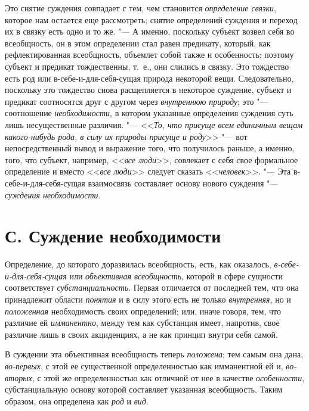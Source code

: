 Это снятие суждения совпадает с тем, чем становится
{\em определение связки},
которое нам остается еще рассмотреть; снятие определений
суждения и переход их в связку есть одно и то же. "--- А
именно, поскольку субъект возвел себя во всеобщность, он в этом определении
стал равен предикату, который, как рефлектированная всеобщность, объемлет
собой также и особенность; поэтому субъект и предикат тождественны, т.~е.,
они слились в связку. Это тождество есть род или в-себе-и-для-себя-сущая
природа некоторой вещи. Следовательно, поскольку это тождество снова
расщепляется в некоторое суждение, субъект и предикат соотносятся друг с
другом через {\em внутреннюю
}{\em природу}; это
"--- соотношение
{\em необходимости}, в
котором указанные определения суждения суть лишь несущественные различия.
"--- <<{\em То, что присуще всем единичным
вещам какого-нибудь рода, в силу их природы присуще и роду}>>
"--- вот непосредственный вывод и выражение того, что получилось
раньше, а именно, того, что субъект, например,
<<{\em все люди}>>,
совлекает с себя свое формальное определение и вместо
<<{\em все люди}>> следует
сказать <<{\em человек}>>. "---
Эта в-себе-и-для-себя-сущая взаимосвязь составляет основу
нового суждения "--- {\em суждения
необходимости}.

\section[С. Суждение необходимости]{С. Суждение необходимости}
Определение, до которого доразвилась всеобщность, есть, как
оказалось,
{\em в-себе-и-для-себя-сущая}
или {\em объективная
всеобщность}, которой в сфере сущности соответствует
{\em субстанциальность}.
Первая отличается от последней тем, что она принадлежит
области {\em понятия} и в
силу этого есть не только
{\em внутренняя}, но и
{\em положенная}
необходимость своих определений; или, иначе говоря, тем, что
различие ей {\em имманентно},
между тем как субстанция имеет, напротив, свое различие лишь
в своих акциденциях, а не как принцип внутри себя самой.

В суждении эта объективная всеобщность теперь
{\em положена}; тем самым
она дана, {\em во-первых},
с этой ее существенной определенностью как имманентной ей и,
{\em во-вторых}, с этой
же определенностью как отличной от нее в качестве
{\em особенности},
субстанциальную основу которой составляет указанная
всеобщность. Таким образом, она определена как
{\em род} и
{\em вид}.

